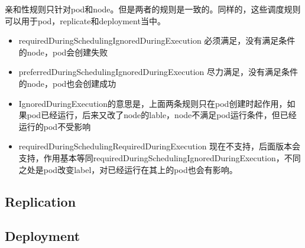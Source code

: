 亲和性规则只针对pod和node。但是两者的规则是一致的。同样的，这些调度规则可以用于pod，replicate和deployment当中。
\begin{itemize}
    \item requiredDuringSchedulingIgnoredDuringExecution   必须满足，没有满足条件的node，pod会创建失败
    \item preferredDuringSchedulingIgnoredDuringExecution  尽力满足，没有满足条件的node，pod也会创建成功
    \item IgnoredDuringExecution的意思是，上面两条规则只在pod创建时起作用，如果pod已经运行，后来又改了node的lable，node不满足pod运行条件，但已经运行的pod不受影响
    \item requiredDuringSchedulingRequiredDuringExecution  现在不支持，后面版本会支持，作用基本等同requiredDuringSchedulingIgnoredDuringExecution，不同之处是pod改变label，对已经运行在其上的pod也会有影响。
\end{itemize}

\subsection{Replication}

\subsection{Deployment}